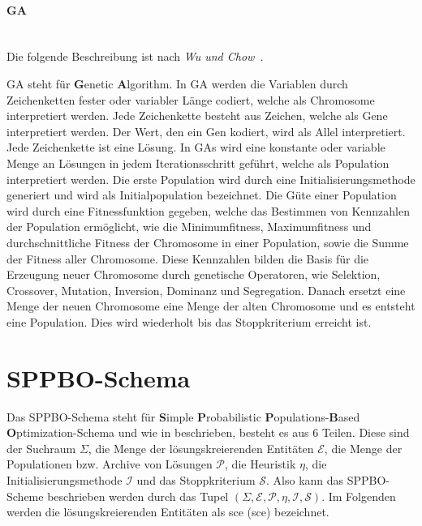 \documentclass[fontsize=12, a4aper]{scrartcl}
\begin{document}
	\paragraph{GA}\mbox{}\\
	
	Die folgende Beschreibung ist nach \textit{Wu und Chow}~\cite{wu1995genetic}.\hfill\newline
	
	GA steht für \textbf{G}enetic \textbf{A}lgorithm. In GA werden die Variablen durch Zeichenketten fester oder variabler Länge codiert, welche als Chromosome interpretiert werden. Jede Zeichenkette besteht aus Zeichen, welche als Gene interpretiert werden. Der Wert, den ein Gen kodiert, wird als Allel interpretiert. Jede Zeichenkette ist eine Lösung. In GAs wird eine konstante oder variable Menge an Lösungen in jedem Iterationsschritt geführt, welche als Population interpretiert werden. Die erste Population wird durch eine Initialisierungsmethode generiert und wird als Initialpopulation bezeichnet. Die Güte einer Population wird durch eine Fitnessfunktion gegeben, welche das Bestimmen von Kennzahlen der Population ermöglicht, wie die Minimumfitness, Maximumfitness und durchschnittliche Fitness der Chromosome in einer Population, sowie die Summe der Fitness aller Chromosome. Diese Kennzahlen bilden die Basis für die Erzeugung neuer Chromosome durch genetische Operatoren, wie Selektion, Crossover, Mutation, Inversion, Dominanz und Segregation. Danach ersetzt eine Menge der neuen Chromosome eine Menge der alten Chromosome und es entsteht eine Population. Dies wird wiederholt bis das Stoppkriterium erreicht ist.
	
	\section{SPPBO-Schema} \label{sec:SPPBO_Schema}
	
	Das SPPBO-Schema steht für \textbf{S}imple \textbf{P}robabilistic \textbf{P}opulations-\textbf{B}ased \textbf{O}ptimization-Schema und wie in \cite{lin2015simple} beschrieben, besteht es aus 6 Teilen. Diese sind der Suchraum \(\Sigma\), die Menge der lösungskreierenden Entitäten \(\mathcal{E}\), die Menge der Populationen bzw. Archive von Lösungen \(\mathcal{P}\), die Heuristik \(\eta\), die Initialisierungsmethode \(\mathcal{I}\) und das Stoppkriterium \(\mathcal{S}\). Also kann das SPPBO-Scheme beschrieben werden durch das Tupel \((\Sigma, \mathcal{E}, \mathcal{P}, \eta, \mathcal{I}, \mathcal{S})\). Im Folgenden werden die lösungskreierenden Entitäten als \ac{sce} (\acl{sce}) bezeichnet.\hfill\newline
	
\end{document}
